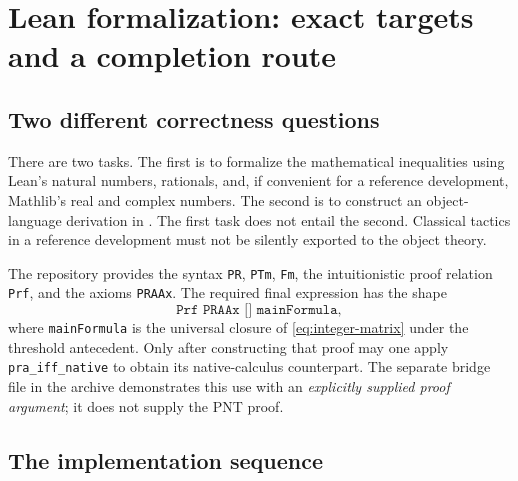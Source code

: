 \section{Lean formalization: exact targets and a completion route}
\label{sec:formalization}

\subsection{Two different correctness questions}

There are two tasks. The first is to formalize the mathematical inequalities
using Lean's natural numbers, rationals, and, if convenient for a reference
development, Mathlib's real and complex numbers. The second is to construct
an object-language derivation in \ipra. The first task does not entail the
second. Classical tactics in a reference development must not be silently
exported to the object theory.

The repository provides the syntax \texttt{PR}, \texttt{PTm},
\texttt{Fm}, the intuitionistic proof relation \texttt{Prf}, and the
axioms \texttt{PRAAx}. The required final expression has the shape
\[
 \texttt{Prf PRAAx [] mainFormula},
\]
where \texttt{mainFormula} is the universal closure of
\eqref{eq:integer-matrix} under the threshold antecedent.
Only after constructing that proof may one apply
\texttt{pra\_iff\_native} to obtain its native-calculus counterpart.
The separate bridge file in the archive demonstrates this use with an
\emph{explicitly supplied proof argument}; it does not supply the PNT proof.

\subsection{The implementation sequence}

